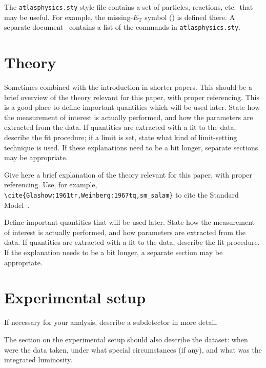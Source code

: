 \documentclass[PAPER,UKenglish,texlive=2016]{\ATLASLATEXPATH atlasdoc}
\begin{document}
The \texttt{atlasphysics.sty} style file contains a set of particles,
reactions, etc.\ that may be useful. For example, the missing-$E_{\text{T}}$
symbol (\met{}) is defined there. 
A separate document~\cite{atlas-physics}
contains a list of the commands in \texttt{atlasphysics.sty}.


\section{Theory}
\label{sec:theory}

Sometimes combined with the introduction in shorter papers. 
This should be a brief overview of the theory relevant for this paper, with proper referencing.
This is a good place to define important quantities which will be used later.
State how the measurement of interest is actually performed, and how the parameters are extracted from the data.
If quantities are extracted with a fit to the data, describe the fit procedure;
if a limit is set, state what kind of limit-setting technique is used.
If these explanations need to be a bit longer, separate sections may be appropriate.

Give here a brief explanation of the theory relevant for this paper,
with proper referencing. Use, for example,
\verb|\cite{Glashow:1961tr,Weinberg:1967tq,sm_salam}| to cite the
Standard Model~\cite{Glashow:1961tr,Weinberg:1967tq,sm_salam}.

Define important quantities that will be used later.
State how the measurement of interest is actually performed, and how parameters are
extracted from the data.
If quantities are extracted with a fit to the data, describe the fit procedure.
If the explanation needs to be a bit longer, a separate section may be appropriate.


\section{Experimental setup}
\label{sec:atlas}

If necessary for your analysis, describe a subdetector in more detail.

The section on the experimental setup should also describe the dataset:
when were the data taken, under what special circumstances (if any),
and what was the integrated luminosity.
\end{document}

